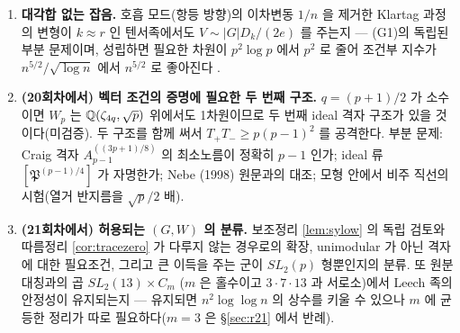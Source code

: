 \begin{enumerate}
\item \textbf{대각합 없는 잡음.} 호흡 모드(항등 방향)의 이차변동 $1/n$ 을 제거한 Klartag 과정의 변형이 $k\approx r$ 인 텐서족에서도 $V\sim|G|D_k/(2e)$ 를 주는지 --- (G1)의 독립된 부분 문제이며, 성립하면 필요한 차원이 $p^2\log p$ 에서 $p^2$ 로 줄어 조건부 지수가 $n^{5/2}/\sqrt{\log n}$ 에서 $n^{5/2}$ 로 좋아진다 \tagH.
\item \textbf{(20회차에서) 벡터 조건의 증명에 필요한 두 번째 구조.} $q=(p+1)/2$ 가 소수이면 $W_p$ 는 $\mathbb{Q}(\zeta_{4q},\sqrt p)$ 위에서도 1차원이므로 두 번째 ideal 격자 구조가 있을 것이다(미검증). 두 구조를 함께 써서 $T_+T_-\ge p(p-1)^2$ 를 공격한다. 부분 문제: Craig 격자 $A_{p-1}^{((3p+1)/8)}$ 의 최소노름이 정확히 $p-1$ 인가; ideal 류 $[\mathfrak P^{(p-1)/4}]$ 가 자명한가; Nebe (1998) 원문과의 대조; 모형 안에서 비주 직선의 시험(열거 반지름을 $\sqrt p/2$ 배).
\item \textbf{(21회차에서) 허용되는 $(G,W)$ 의 분류.} 보조정리 \ref{lem:sylow} 의 독립 검토와 따름정리 \ref{cor:tracezero} 가 다루지 않는 경우로의 확장, unimodular 가 아닌 격자에 대한 필요조건, 그리고 큰 이득을 주는 군이 $SL_2(p)$ 형뿐인지의 분류. 또 원분 대칭과의 곱 $SL_2(13)\times C_m$ ($m$ 은 홀수이고 $3\cdot7\cdot13$ 과 서로소)에서 Leech 족의 안정성이 유지되는지 --- 유지되면 $n^2\log\log n$ 의 상수를 키울 수 있으나 $m$ 에 균등한 정리가 따로 필요하다($m=3$ 은 \S\ref{sec:r21} 에서 반례).
\end{enumerate}
